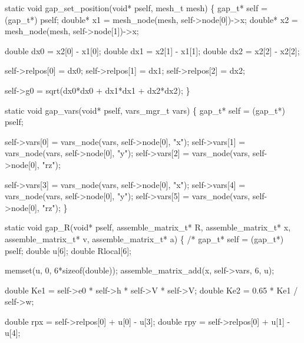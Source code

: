 \nwendcode{}\nwdocspar

\nwenddocs{}\plusendmoddef
static void gap_set_position(void* pself, mesh_t mesh)
\{
    gap_t* self = (gap_t*) pself;
    double* x1 = mesh_node(mesh, self->node[0])->x;
    double* x2 = mesh_node(mesh, self->node[1])->x;

    double dx0 = x2[0] - x1[0];
    double dx1 = x2[1] - x1[1];
    double dx2 = x2[2] - x2[2];

    self->relpos[0] = dx0;
    self->relpos[1] = dx1;
    self->relpos[2] = dx2;

    self->g0 = sqrt(dx0*dx0 + dx1*dx1 + dx2*dx2);
\}

\nwendcode{}\nwdocspar

\nwenddocs{}\plusendmoddef
static void gap_vars(void* pself, vars_mgr_t vars)
\{
    gap_t* self = (gap_t*) pself;

    self->vars[0] = vars_node(vars, self->node[0], "x");
    self->vars[1] = vars_node(vars, self->node[0], "y");
    self->vars[2] = vars_node(vars, self->node[0], "rz");

    self->vars[3] = vars_node(vars, self->node[0], "x");
    self->vars[4] = vars_node(vars, self->node[0], "y");
    self->vars[5] = vars_node(vars, self->node[0], "rz");
\}

\nwendcode{}\nwdocspar

\nwenddocs{}\plusendmoddef
static void gap_R(void* pself, assemble_matrix_t* R,
                  assemble_matrix_t* x,
                  assemble_matrix_t* v,
                  assemble_matrix_t* a)
\{
/*
    gap_t* self = (gap_t*) pself;
    double u[6];
    double Rlocal[6];

    memset(u, 0, 6*sizeof(double));
    assemble_matrix_add(x, self->vars, 6, u);

    double Ke1 = self->e0 * self->h * self->V * self->V;
    double Ke2 = 0.65 * Ke1 / self->w;

    double rpx = self->relpos[0] + u[0] - u[3];
    double rpy = self->relpos[0] + u[1] - u[4];

